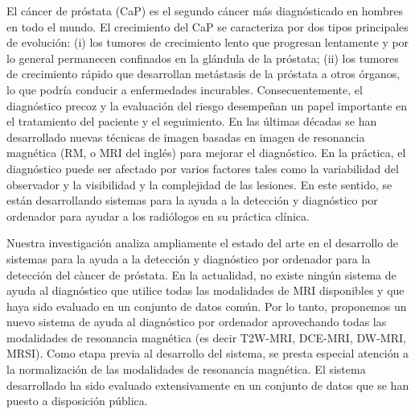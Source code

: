 \begin{abstractSpanish}

El c\'ancer de pr\'ostata (CaP) es el segundo c\'ancer m\'as diagn\'osticado en hombres en todo el mundo.
El crecimiento del CaP se caracteriza por dos tipos principales de evoluci\'on: (i) los tumores de crecimiento lento que progresan lentamente y por lo general permanecen confinados en la gl\'andula de la pr\'ostata; (ii) los tumores de crecimiento r\'apido que desarrollan met\'astasis de la pr\'ostata a otros \'organos, lo que podr\'ia conducir a enfermedades incurables.
Consecuentemente, el diagn\'ostico precoz y la evaluaci\'on del riesgo desempe\~nan un papel importante en el tratamiento del paciente y el seguimiento. En las \'ultimas d\'ecadas se han desarrollado  nuevas t\'ecnicas de imagen basadas en imagen de resonancia magn\'etica (RM, o MRI del ingl\'es) para mejorar el diagn\'ostico. En la pr\'actica, el diagn\'ostico puede ser afectado por varios factores tales como la variabilidad del observador y la visibilidad y la complejidad de las lesiones.
En este sentido, se est\'an desarrollando sistemas para la ayuda a la detecci\'on y diagn\'ostico por ordenador para ayudar a los radi\'ologos en su pr\'actica cl\'inica.

Nuestra investigaci\'on analiza ampliamente el estado del arte en el desarrollo de sistemas para la ayuda a la detecci\'on y diagn\'ostico por ordenador para la detecci\'on del c\`ancer de pr\'ostata.
En la actualidad, no existe ning\'un sistema de ayuda al diagn\'ostico que utilice todas las modalidades de MRI disponibles y que haya sido evaluado en un conjunto de datos com\'un.
Por lo tanto, proponemos un nuevo sistema de ayuda al diagn\'ostico por ordenador aprovechando todas las modalidades de resonancia magn\'etica (es decir T2W-MRI, DCE-MRI, DW-MRI, MRSI).
Como etapa previa al desarrollo del sistema, se presta especial atenci\'on a la normalizaci\'on de las modalidades de resonancia magn\'etica.
El sistema desarrollado ha sido evaluado extensivamente en un conjunto de datos que se han puesto a disposici\'on p\'ublica.
 
\end{abstractSpanish}


